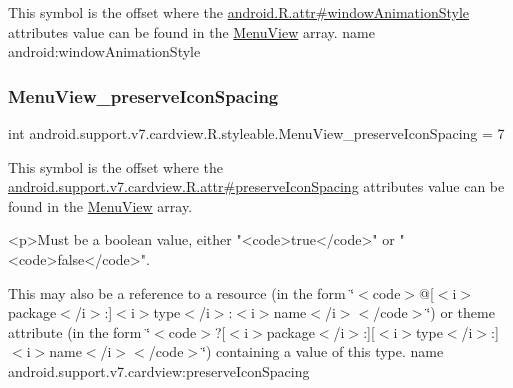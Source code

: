 This symbol is the offset where the \hyperlink{}{android.\+R.\+attr\#window\+Animation\+Style} attribute\textquotesingle{}s value can be found in the \hyperlink{classandroid_1_1support_1_1v7_1_1cardview_1_1R_1_1styleable_aa9f6c3d6d02cac9913617e27d0db7b5f}{Menu\+View} array.  name android\+:window\+Animation\+Style \mbox{\label{classandroid_1_1support_1_1v7_1_1cardview_1_1R_1_1styleable_a034320428c37d4f5c21c75f35207c020}} 
\subsubsection{\texorpdfstring{Menu\+View\+\_\+preserve\+Icon\+Spacing}{MenuView\_preserveIconSpacing}}
{\footnotesize\ttfamily int android.\+support.\+v7.\+cardview.\+R.\+styleable.\+Menu\+View\+\_\+preserve\+Icon\+Spacing = 7\hspace{0.3cm}{\ttfamily [static]}}

This symbol is the offset where the \hyperlink{classandroid_1_1support_1_1v7_1_1cardview_1_1R_1_1attr_ade123c629c5e246957de011a6abb2d72}{android.\+support.\+v7.\+cardview.\+R.\+attr\#preserve\+Icon\+Spacing} attribute\textquotesingle{}s value can be found in the \hyperlink{classandroid_1_1support_1_1v7_1_1cardview_1_1R_1_1styleable_aa9f6c3d6d02cac9913617e27d0db7b5f}{Menu\+View} array.

\begin{DoxyVerb}      <p>Must be a boolean value, either "<code>true</code>" or "<code>false</code>".
\end{DoxyVerb}
 

This may also be a reference to a resource (in the form \char`\"{}$<$code$>$@\mbox{[}$<$i$>$package$<$/i$>$\+:\mbox{]}$<$i$>$type$<$/i$>$\+:$<$i$>$name$<$/i$>$$<$/code$>$\char`\"{}) or theme attribute (in the form \char`\"{}$<$code$>$?\mbox{[}$<$i$>$package$<$/i$>$\+:\mbox{]}\mbox{[}$<$i$>$type$<$/i$>$\+:\mbox{]}$<$i$>$name$<$/i$>$$<$/code$>$\char`\"{}) containing a value of this type.  name android.\+support.\+v7.\+cardview\+:preserve\+Icon\+Spacing \mbox{\label{classandroid_1_1support_1_1v7_1_1cardview_1_1R_1_1styleable_aab4216e563b2e19093e1d57494734202}} 
